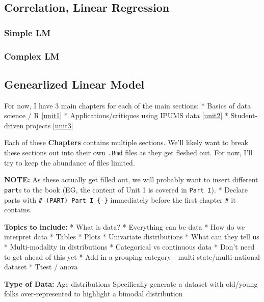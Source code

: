 \documentclass[
]{book}
\begin{document}
\hypertarget{correlation-linear-regression}{%
\subsection{Correlation, Linear Regression}\label{correlation-linear-regression}}

\hypertarget{simple-lm}{%
\subsubsection{Simple LM}\label{simple-lm}}

\hypertarget{complex-lm}{%
\subsubsection{Complex LM}\label{complex-lm}}

\hypertarget{genearlized-linear-model}{%
\subsection{Genearlized Linear Model}\label{genearlized-linear-model}}

For now, I have 3 main chapters for each of the main sections:
* Basics of data science / R \ref{unit1}
* Applications/critiques using IPUMS data \ref{unit2}
* Student-driven projects \ref{unit3}

Each of these \textbf{Chapters} contains multiple sections. We'll likely want to break these sections out into their own \texttt{.Rmd} files as they get fleshed out. For now, I'll try to keep the abundance of files limited.

\textbf{NOTE:} As these actually get filled out, we will probably want to insert different \texttt{part}s to the book (EG, the content of Unit 1 is covered in \texttt{Part\ I}).
* Declare parts with \texttt{\#\ (PART)\ Part\ I\ \{-\}} immediately before the first chapter \texttt{\#} it contains.

\textbf{Topics to include:}
* What is data?
* Everything can be data
* How do we interpret data
* Tables
* Plots
* Univariate distributions
* What can they tell us
* Multi-modality in distributions
* Categorical vs continuous data
* Don't need to get ahead of this yet
* Add in a grouping category - multi state/multi-national dataset
* Ttest / anova

\textbf{Type of Data:}
Age distributions
Specifically generate a dataset with old/young folks over-represented to highlight a bimodal distribution
\end{document}
